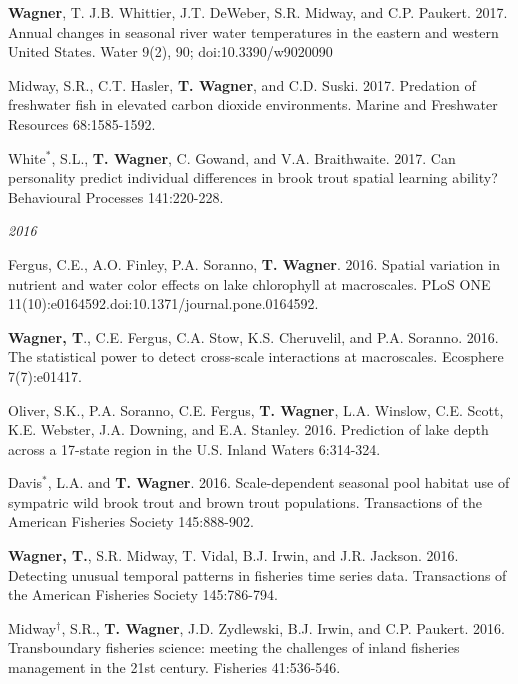 \documentclass[10pt]{article}
\begin{document}
\begin{flushleft}
\begin{etaremune}[start=68]
\item {\bf Wagner}, T. J.B. Whittier, J.T. DeWeber, S.R. Midway, and C.P. Paukert. 2017. Annual changes in seasonal river water temperatures in the eastern and western United States. Water 9(2), 90; doi:10.3390/w9020090

\item Midway, S.R., C.T. Hasler, {\bf T. Wagner}, and C.D. Suski. 2017. Predation of freshwater fish in elevated carbon dioxide environments. Marine and Freshwater Resources 68:1585-1592.

\item White$^*$, S.L., {\bf T. Wagner}, C. Gowand, and V.A. Braithwaite. 2017. Can personality predict individual differences in brook trout spatial learning ability? Behavioural Processes 141:220-228. 

\end{etaremune}
\emph{2016}
\begin{etaremune}[start=55]

\item Fergus, C.E., A.O. Finley, P.A. Soranno, {\bf T. Wagner}. 2016. Spatial variation in nutrient and water color effects on lake chlorophyll at macroscales. PLoS ONE 11(10):e0164592.doi:10.1371/journal.pone.0164592.

\item {\bf Wagner, T}., C.E. Fergus, C.A. Stow, K.S. Cheruvelil, and P.A. Soranno. 2016. The statistical power to detect cross-scale interactions at macroscales. Ecosphere 7(7):e01417.

\item Oliver, S.K., P.A. Soranno, C.E. Fergus, {\bf T. Wagner}, L.A. Winslow, C.E. Scott, K.E. Webster, J.A. Downing, and E.A. Stanley. 2016. Prediction of lake depth across a 17-state region in the U.S. Inland Waters 6:314-324.

\item Davis$^*$, L.A. and {\bf T. Wagner}. 2016. Scale-dependent seasonal pool habitat use of sympatric wild brook trout and brown trout populations. Transactions of the American Fisheries Society 145:888-902.

\item {\bf Wagner, T.}, S.R. Midway, T. Vidal, B.J. Irwin, and J.R. Jackson. 2016. Detecting unusual temporal patterns in fisheries time series data. Transactions of the American Fisheries Society 145:786-794.

\item Midway$^\dagger$, S.R., {\bf T. Wagner}, J.D. Zydlewski, B.J. Irwin, and C.P. Paukert. 2016. Transboundary fisheries science: meeting the challenges of inland fisheries management in the 21st century. Fisheries 41:536-546.


\end{etaremune}
\end{flushleft}
\end{document}
